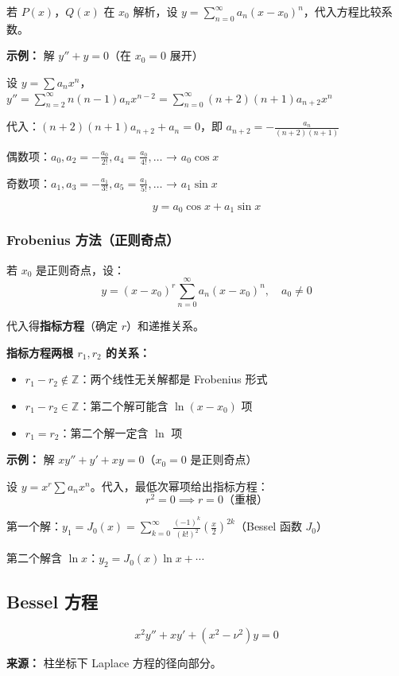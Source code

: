 若 $P(x)$，$Q(x)$ 在 $x_0$ 解析，设 $y = \sum_{n=0}^{\infty} a_n (x-x_0)^n$，代入方程比较系数。

\textbf{示例：} 解 $y'' + y = 0$（在 $x_0 = 0$ 展开）

设 $y = \sum a_n x^n$，$y'' = \sum_{n=2}^{\infty} n(n-1)a_n x^{n-2} = \sum_{n=0}^{\infty}(n+2)(n+1)a_{n+2} x^n$

代入：$(n+2)(n+1)a_{n+2} + a_n = 0$，即 $a_{n+2} = -\frac{a_n}{(n+2)(n+1)}$

偶数项：$a_0, a_2 = -\frac{a_0}{2!}, a_4 = \frac{a_0}{4!}, \ldots$ → $a_0\cos x$

奇数项：$a_1, a_3 = -\frac{a_1}{3!}, a_5 = \frac{a_1}{5!}, \ldots$ → $a_1\sin x$

\[
y = a_0\cos x + a_1\sin x
\]

\subsubsection{Frobenius 方法（正则奇点）}

若 $x_0$ 是正则奇点，设：
\[
y = (x-x_0)^r \sum_{n=0}^{\infty} a_n (x-x_0)^n, \quad a_0 \neq 0
\]

代入得\textbf{指标方程}（确定 $r$）和递推关系。

\textbf{指标方程两根 $r_1, r_2$ 的关系：}
\begin{itemize}
  \item $r_1 - r_2 \notin \mathbb{Z}$：两个线性无关解都是 Frobenius 形式
  \item $r_1 - r_2 \in \mathbb{Z}$：第二个解可能含 $\ln(x-x_0)$ 项
  \item $r_1 = r_2$：第二个解一定含 $\ln$ 项
\end{itemize}

\textbf{示例：} 解 $xy'' + y' + xy = 0$（$x_0 = 0$ 是正则奇点）

设 $y = x^r \sum a_n x^n$。代入，最低次幂项给出指标方程：
\[
r^2 = 0 \implies r = 0 \text{（重根）}
\]

第一个解：$y_1 = J_0(x) = \sum_{k=0}^{\infty} \frac{(-1)^k}{(k!)^2}\left(\frac{x}{2}\right)^{2k}$（Bessel 函数 $J_0$）

第二个解含 $\ln x$：$y_2 = J_0(x)\ln x + \cdots$

\subsection{Bessel 方程}

\[
x^2 y'' + xy' + (x^2 - \nu^2)y = 0
\]

\textbf{来源：} 柱坐标下 Laplace 方程的径向部分。

